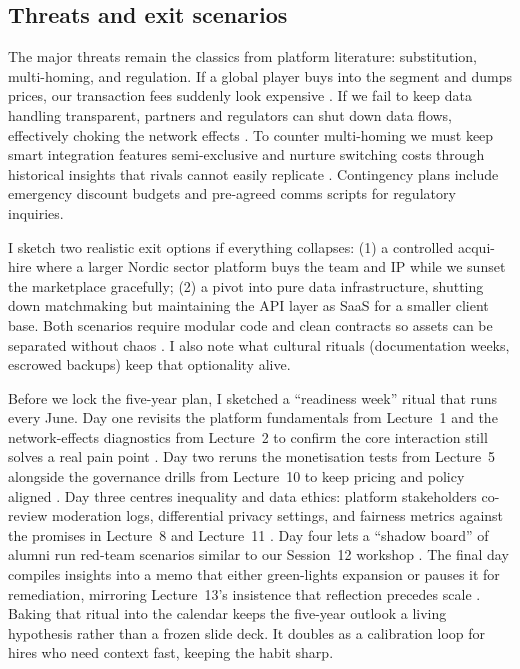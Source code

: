 \subsection*{Threats and exit scenarios}
The major threats remain the classics from platform literature: substitution, multi-homing, and regulation. If a global player buys into the segment and dumps prices, our transaction fees suddenly look expensive \citep{Porter2008}. If we fail to keep data handling transparent, partners and regulators can shut down data flows, effectively choking the network effects \citep{Srnicek2017}. To counter multi-homing we must keep smart integration features semi-exclusive and nurture switching costs through historical insights that rivals cannot easily replicate \citep{FarrellSaloner1986}. Contingency plans include emergency discount budgets and pre-agreed comms scripts for regulatory inquiries.

I sketch two realistic exit options if everything collapses: (1) a controlled acqui-hire where a larger Nordic sector platform buys the team and IP while we sunset the marketplace gracefully; (2) a pivot into pure data infrastructure, shutting down matchmaking but maintaining the API layer as SaaS for a smaller client base. Both scenarios require modular code and clean contracts so assets can be separated without chaos \citep{Reillier2017}. I also note what cultural rituals (documentation weeks, escrowed backups) keep that optionality alive.

Before we lock the five-year plan, I sketched a ``readiness week'' ritual that runs every June. Day one revisits the platform fundamentals from Lecture~1 and the network-effects diagnostics from Lecture~2 to confirm the core interaction still solves a real pain point \citep{Lecture01,Lecture02}. Day two reruns the monetisation tests from Lecture~5 alongside the governance drills from Lecture~10 to keep pricing and policy aligned \citep{Lecture05,Lecture10}. Day three centres inequality and data ethics: platform stakeholders co-review moderation logs, differential privacy settings, and fairness metrics against the promises in Lecture~8 and Lecture~11 \citep{Lecture08,Lecture11}. Day four lets a ``shadow board'' of alumni run red-team scenarios similar to our Session~12 workshop \citep{Lecture12}. The final day compiles insights into a memo that either green-lights expansion or pauses it for remediation, mirroring Lecture~13's insistence that reflection precedes scale \citep{Lecture13}. Baking that ritual into the calendar keeps the five-year outlook a living hypothesis rather than a frozen slide deck. It doubles as a calibration loop for hires who need context fast, keeping the habit sharp.

